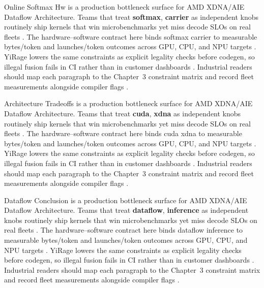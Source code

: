 Online Softmax Hw is a production bottleneck surface for AMD XDNA/AIE Dataflow Architecture. Teams that treat \textbf{softmax}, \textbf{carrier} as independent knobs routinely ship kernels that win microbenchmarks yet miss decode SLOs on real fleets \citep{memoryfloor2026,amd2024xdna}. The hardware--software contract here binds softmax carrier to measurable bytes/token and launches/token outcomes across GPU, CPU, and NPU targets \citep{nvidia2022hopper,amd2024aie}. YiRage lowers the same constraints as explicit legality checks before codegen, so illegal fusion fails in CI rather than in customer dashboards \citep{semianalysis2024tma,dlbook}. Industrial readers should map each paragraph to the Chapter~3 constraint matrix and record fleet measurements alongside compiler flags \citep{amd2024xdna,dao2022flashattention}.

Architecture Tradeoffs is a production bottleneck surface for AMD XDNA/AIE Dataflow Architecture. Teams that treat \textbf{cuda}, \textbf{xdna} as independent knobs routinely ship kernels that win microbenchmarks yet miss decode SLOs on real fleets \citep{nvidia2022hopper,amd2024aie}. The hardware--software contract here binds cuda xdna to measurable bytes/token and launches/token outcomes across GPU, CPU, and NPU targets \citep{semianalysis2024tma,dlbook}. YiRage lowers the same constraints as explicit legality checks before codegen, so illegal fusion fails in CI rather than in customer dashboards \citep{amd2024xdna,dao2022flashattention}. Industrial readers should map each paragraph to the Chapter~3 constraint matrix and record fleet measurements alongside compiler flags \citep{amd2024aie,kwon2023vllm}.

Dataflow Conclusion is a production bottleneck surface for AMD XDNA/AIE Dataflow Architecture. Teams that treat \textbf{dataflow}, \textbf{inference} as independent knobs routinely ship kernels that win microbenchmarks yet miss decode SLOs on real fleets \citep{semianalysis2024tma,dlbook}. The hardware--software contract here binds dataflow inference to measurable bytes/token and launches/token outcomes across GPU, CPU, and NPU targets \citep{amd2024xdna,dao2022flashattention}. YiRage lowers the same constraints as explicit legality checks before codegen, so illegal fusion fails in CI rather than in customer dashboards \citep{amd2024aie,kwon2023vllm}. Industrial readers should map each paragraph to the Chapter~3 constraint matrix and record fleet measurements alongside compiler flags \citep{dlbook,nvidia2024cudagraphs}.

